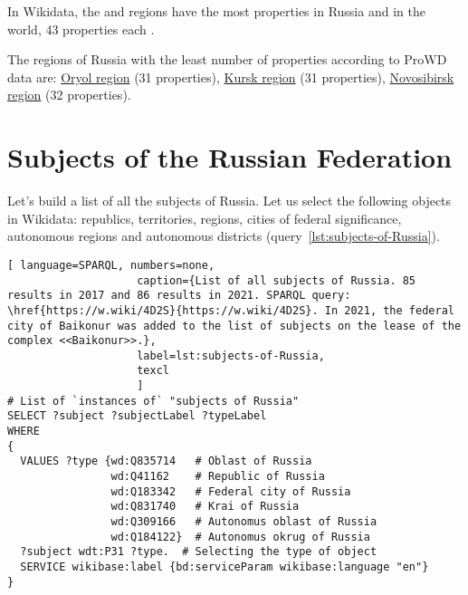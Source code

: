 In Wikidata, the  and  regions have the most properties in Russia and in the world, 43 properties each \autocite{Russia_prowd}.

The regions of Russia with the least number of properties according to ProWD data are: \href{http://www.wikidata.org/entity/Q3129 }{Oryol region} (31 properties), \href{http://www.wikidata.org/entity/Q3178 }{Kursk region} (31 properties), \href{http://www.wikidata.org/entity/Q5851 }{Novosibirsk region} (32 properties).

\section{Subjects of the Russian Federation}

Let's build a list of all the subjects of Russia. Let us select the following objects in Wikidata: republics, territories, regions, cities of federal significance, autonomous regions and autonomous districts (query~\ref{lst:subjects-of-Russia}).


\begin{lstlisting}[ language=SPARQL, numbers=none,
                    caption={List of all subjects of Russia. 85 results in 2017 and 86 results in 2021. SPARQL query: \href{https://w.wiki/4D2S}{https://w.wiki/4D2S}. In 2021, the federal city of Baikonur was added to the list of subjects on the lease of the complex <<Baikonur>>.},
                    label=lst:subjects-of-Russia,
                    texcl 
                    ]
# List of `instances of` "subjects of Russia" 
SELECT ?subject ?subjectLabel ?typeLabel
WHERE
{  
  VALUES ?type {wd:Q835714   # Oblast of Russia
                wd:Q41162    # Republic of Russia
                wd:Q183342   # Federal city of Russia
                wd:Q831740   # Krai of Russia
                wd:Q309166   # Autonomus oblast of Russia
                wd:Q184122}  # Autonomus okrug of Russia
  ?subject wdt:P31 ?type.  # Selecting the type of object
  SERVICE wikibase:label {bd:serviceParam wikibase:language "en"}
}
\end{lstlisting}%

